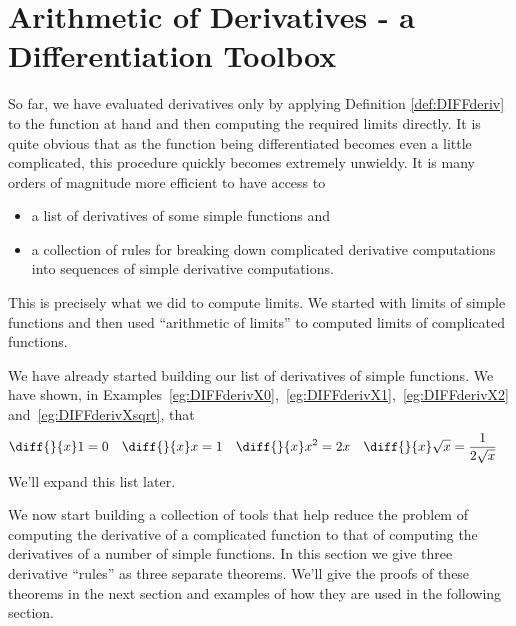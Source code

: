 \section{Arithmetic of Derivatives - a Differentiation Toolbox}\label{sec_2_4}

So far, we have evaluated derivatives only by applying
Definition \ref{def:DIFFderiv} to the function at hand and then computing the
required limits directly. It is quite obvious that as the function being
differentiated becomes even a little complicated, this procedure quickly becomes
extremely unwieldy. It is many orders of magnitude more efficient to have
access to
\begin{itemize}
\item a list of derivatives of some simple functions and
\item a collection of rules for breaking down complicated derivative computations
   into sequences of simple derivative computations.
\end{itemize}
This is precisely what we did to compute limits. We started with limits of
simple functions and then used ``arithmetic of limits'' to computed limits of
complicated functions.

We have already started building our list of derivatives of simple
functions. We have shown, in
Examples~\ref{eg:DIFFderivX0},~\ref{eg:DIFFderivX1},~\ref{eg:DIFFderivX2}
and~\ref{eg:DIFFderivXsqrt}, that
\begin{align*}
\diff{}{x} 1 &= 0 &
\diff{}{x} x &= 1 &
\diff{}{x} x^2 &= 2x &
\diff{}{x} \sqrt{x} &= \frac{1}{2\sqrt{x}}
\end{align*}
We'll expand this list later.

We now start building a collection of tools that help reduce the problem of computing the
derivative of a complicated function to that of computing the derivatives of a number of
simple functions. In this section we give three derivative ``rules'' as three separate
theorems. We'll give the proofs of these theorems in the next section and examples
of how they are used in the following section.

